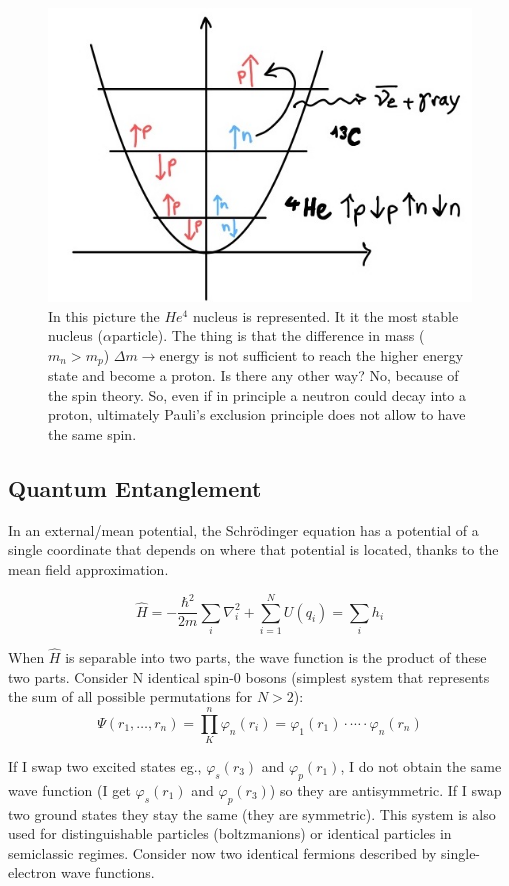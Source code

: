 	\begin{figure}[htbp!]
 \centering
 \includegraphics[scale=0.20]{img_7}
 \caption{In this picture the $He^4$ nucleus is represented.
					It it the most stable nucleus ($\alpha$particle).
					The thing is that the difference in mass ($m_n > m_p$) $\Delta m \rightarrow \text{energy}$ is not sufficient to reach the higher energy state and become a proton.
					Is there any other way? No, because of the spin theory.
					So, even if in principle a neutron could decay into a proton, ultimately Pauli's exclusion principle does not allow to have the same spin.}
 \label{fig:decay}
	\end{figure}

	\subsection{Quantum Entanglement}
	In an external/mean potential, the Schr\"odinger equation has a potential of a single coordinate that depends on where that potential is located, thanks to the mean field approximation.

	$$\hat{H}=-\frac{\hbar^2}{2m}\sum_{i}\nabla_i^2+\sum_{i=1}^NU(q_i)=\sum_i h_i$$

	When $\hat{H}$ is separable into two parts, the wave function is the product of these two parts.
	Consider N identical spin-0 bosons (simplest system that represents the sum of all possible permutations for $N > 2$):
	$$\Psi(r_1, \dots, r_n)= \prod_K^n\varphi_n(r_i)=\varphi_1(r_1)\cdot \cdots\cdot \varphi_n(r_n)$$

	If I swap two excited states eg., $\varphi_s(r_3)$ and $\varphi_p(r_1)$, I do not obtain the same wave function (I get $\varphi_s(r_1)$ and $\varphi_p(r_3)$) so they are antisymmetric.
If I swap two ground states they stay the same (they are symmetric).
This system is also used for distinguishable particles (boltzmanions) or identical particles in semiclassic regimes.
	\newline
	Consider now two identical fermions described by single-electron wave functions.


